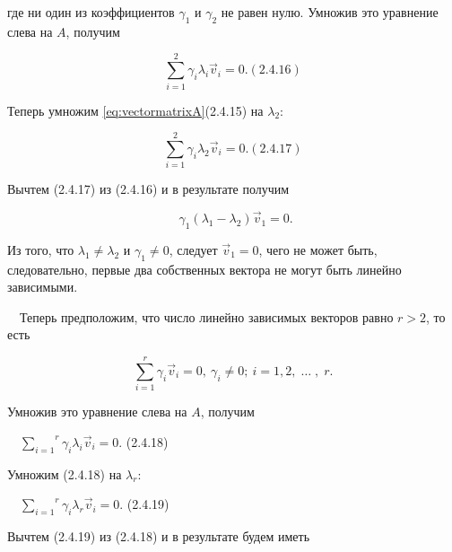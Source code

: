 		где ни один из коэффициентов  $γ_1$ и  $γ_2$ не равен нулю. Умножив это уравнение слева на  $A$, получим



\begin{equation}\label{key}
	\overset 2{\underset{i=1}{\sum }}γ_i\lambda _i\vec v_i=0.  (2.4.16)
\end{equation}



		Теперь умножим \eqref{eq:vectormatrixA}(2.4.15) на  $\lambda _2$:



	\begin{equation}\label{key}
		\overset 2{\underset{i=1}{\sum }}γ_i\lambda _2\vec v_i=0.  (2.4.17)
	\end{equation}



		Вычтем (2.4.17) из (2.4.16) и в результате получим



\begin{equation*}\label{key}
		\ \  γ_1(\lambda _1-\lambda _2)\vec v_1=0.
\end{equation*}



		Из того, что  $\lambda _1\neq \lambda _2$ и  $γ_1\neq 0$, следует  $\vec v_1=0$, чего не может быть, следовательно, первые два
		собственных вектора не могут быть линейно зависимыми.



		\ \ Теперь предположим, что число линейно зависимых векторов равно  $r>2$, то есть



\begin{equation*}\label{key}
		\ \  \overset r{\underset{i=1}{\sum }}γ_i\vec v_i=0,\ γ_i\neq 0;\ i=1,2,\;\ldots \;,\;r.\ \ 
\end{equation*}



		Умножив это уравнение слева на  $A$, получим



		\ \  $\overset r{\underset{i=1}{\sum }}γ_i\lambda _i\vec v_i=0$.  (2.4.18)



		Умножим (2.4.18) на  $\lambda _r$:



		\ \  $\overset r{\underset{i=1}{\sum }}γ_i\lambda _r\vec v_i=0$.  (2.4.19)



		Вычтем (2.4.19) из (2.4.18) и в результате будем иметь



